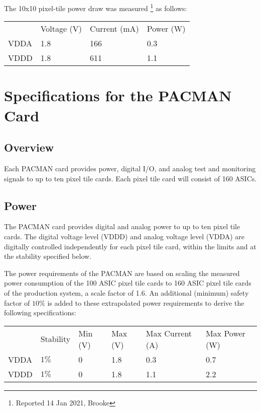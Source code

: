 \documentclass[12pt]{article}
\begin{document}
\newpage
The 10x10 pixel-tile power draw was measured \footnote{Reported 14 Jan 2021, Brooke} as follows:
\begin{center}
\begin{tabular}{llll}
   & Voltage (V) & Current (mA) & Power (W) \\
VDDA  & 1.8 & 166  & 0.3  \\
VDDD  & 1.8 & 611  & 1.1  \\
\end{tabular}
\end{center}

\section{Specifications for the PACMAN Card}

\subsection{Overview}

Each PACMAN card provides power, digital I/O, and analog test and
monitoring signals to up to ten pixel tile cards.  Each pixel tile
card will consist of 160 ASICs.

\subsection{Power}

The PACMAN card provides digital and analog power to up to ten pixel
tile cards.  The digital voltage level (VDDD) and analog voltage level
(VDDA) are digitally controlled independently for each pixel tile
card, within the limits and at the stability specified below.

The power requirements of the PACMAN are based on scaling the measured
power consumption of the 100 ASIC pixel tile cards to 160 ASIC pixel
tile cards of the production system, a scale factor of 1.6.  An
additional (minimum) safety factor of $10\%$ is added to these
extrapolated power requirements to derive the following
specifications:
\begin{center}
\begin{tabular}{llllll}
      & Stability & Min (V) & Max (V) & Max Current (A) & Max Power (W) \\
VDDA  & $1\%$ & 0 & 1.8 & 0.3 & 0.7\\
VDDD  & $1\%$ & 0 & 1.8 & 1.1 & 2.2\\
\end{tabular}
\end{center}
\end{document}
